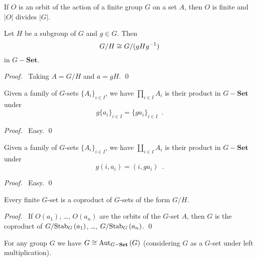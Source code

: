 \begin{cor}
If $O$ is an orbit of the action of a finite group $G$ on a set $A$, then $O$ is finite and $|O|$ divides $|G|$.
\end{cor}

\begin{cor}
Let $H$ be a subgroup of $G$ and $g \in G$. Then
\[ G / H \cong G / (g H {g}^{-1}) \]
in $G-\mathbf{Set}$.
\end{cor}

\begin{proof}
\pf\ Taking $A = G / H$ and $a = gH$. \qed
\end{proof}

\begin{prop}
Given a family of $G$-sets $\{ A_i \}_{i \in I}$, we have $\prod_{i \in I} A_i$ is their product in $G-\mathbf{Set}$ under
\[ g \{a_i\}_{i \in I} = \{ga_i\}_{i \in I} \enspace . \]
\end{prop}

\begin{proof}
\pf\ Easy. \qed
\end{proof}

\begin{prop}
Given a family of $G$-sets $\{ A_i \}_{i \in I}$, we have $\coprod_{i \in I} A_i$ is their product in $G-\mathbf{Set}$ under
\[ g (i,a_i) = (i, ga_i) \enspace . \]
\end{prop}

\begin{proof}
\pf\ Easy. \qed
\end{proof}

\begin{prop}
Every finite $G$-set is a coproduct of $G$-sets of the form $G/H$.
\end{prop}

\begin{proof}
\pf\ If $O(a_1)$, \ldots, $O(a_n)$ are the orbits of the $G$-set $A$, then $G$ is the coproduct of $G / \mathrm{Stab}_{G} \left( {a_1} \right)$, \ldots, $G / \mathrm{Stab}_{G} \left( {a_n} \right)$. \qed
\end{proof}

\begin{prop}
For any group $G$ we have $G \cong \mathrm{Aut}_{G-\mathbf{Set}} \left( {G} \right)$ (considering $G$ as a $G$-set under left multiplication).
\end{prop}

